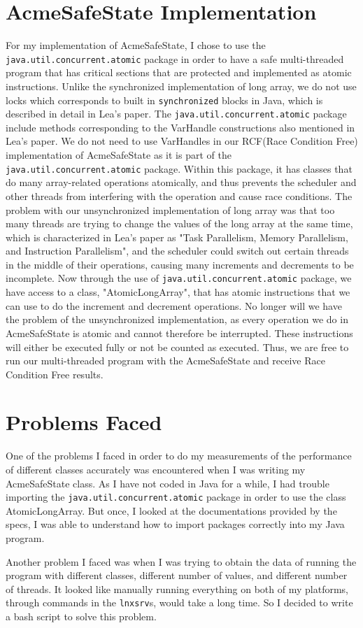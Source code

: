 \section{AcmeSafeState Implementation}
For my implementation of AcmeSafeState, I chose to use the \texttt{java.util.concurrent.atomic} package in order to have a safe multi-threaded program that has critical sections that are protected and implemented as atomic instructions. Unlike the synchronized implementation of long array, we do not use locks which corresponds to built in \texttt{synchronized} blocks in Java, which is described in detail in Lea's paper. The \texttt{java.util.concurrent.atomic} package include methods corresponding to the VarHandle constructions also mentioned in Lea's paper. We do not need to use VarHandles in our RCF(Race Condition Free) implementation of AcmeSafeState as it is part of the \texttt{java.util.concurrent.atomic} package. Within this package, it has classes that do many array-related operations atomically, and thus prevents the scheduler and other threads from interfering with the operation and cause race conditions. The problem with our unsynchronized implementation of long array was that too many threads are trying to change the values of the long array at the same time, which is characterized in Lea's paper as "Task Parallelism, Memory Parallelism, and Instruction Parallelism", and the scheduler could switch out certain threads in the middle of their operations, causing many increments and decrements to be incomplete. Now through the use of \texttt{java.util.concurrent.atomic} package, we have access to a class, "AtomicLongArray", that has atomic instructions that we can use to do the increment and decrement operations. No longer will we have the problem of the unsynchronized implementation, as every operation we do in AcmeSafeState is atomic and cannot therefore be interrupted. These instructions will either be executed fully or not be counted as executed. Thus, we are free to run our multi-threaded program with the AcmeSafeState and receive Race Condition Free results.

\section{Problems Faced}
One of the problems I faced in order to do my measurements of the performance of different classes accurately was encountered when I was writing my AcmeSafeState class. As I have not coded in Java for a while, I had trouble importing the \texttt{java.util.concurrent.atomic} package in order to use the class AtomicLongArray. But once, I looked at the documentations provided by the specs, I was able to understand how to import packages correctly into my Java program. \par
Another problem I faced was when I was trying to obtain the data of running the program with different classes, different number of values, and different number of threads. It looked like manually running everything on both of my platforms, through commands in the \texttt{lnxsrv}s, would take a long time. So I decided to write a bash script to solve this problem.


